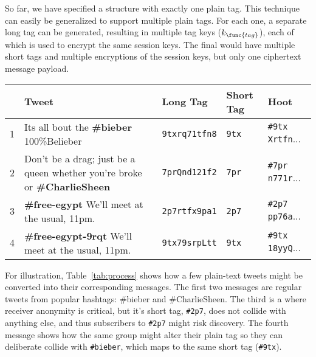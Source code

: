 So far, we have specified a \hoot structure with exactly one plain tag.
This technique can easily be generalized to support multiple plain tags. For
each one, a separate long tag can be generated, resulting in multiple
tag keys ($k_{\func{tag}}$), each of which is used to encrypt the same
session keys. The final \hoot would have multiple short tags and multiple
encryptions of the session keys, but only one ciphertext message
payload.

\begin{table*}
\caption{This table shows how several tweets might be converted to
  \hoot messages, showing the long tag, the short tag, and the final
  \hoot. The fourth message in this list demonstrates how an
  organization could take advantage of the \hoot system to collide its
  messages with those of an unrelated tag used for non-controversial
  messages.
\label{tab:process}
}
\begin{center}
    \begin{tabular}{ l  l  l  l  l }
	 & Tweet & Long Tag & Short Tag & Hoot \\ \hline
	1 & Its all bout the {\bf \#bieber} 100\%Belieber                                 & {\tt 9txrq71tfn8} &  {\tt 9tx} & {\tt \#9tx Xrtfn}... \\
	2 & Don't be a drag; just be a queen whether you're broke or {\bf \#CharlieSheen} & {\tt 7prQnd121f2} & {\tt 7pr} & {\tt \#7pr n771r}... \\
	3 & {\bf \#free-egypt} We'll meet at the usual, 11pm.                             & {\tt 2p7rtfx9pa1} & {\tt 2p7} & {\tt \#2p7 pp76a}... \\
	4 & {\bf \#free-egypt-9rqt} We'll meet at the usual, 11pm.                        & {\tt 9tx79srpLtt} &  {\tt 9tx}  & {\tt \#9tx 18yyQ}... \\
    \end{tabular}
\end{center}
\end{table*}

For illustration, Table~\ref{tab:process} shows how a few plain-text
tweets might be converted into their corresponding \hoot messages. The
first two messages are regular tweets from popular hashtags: \#bieber
and \#CharlieSheen. The third is a \hoot where receiver anonymity is
critical, but it's short tag, {\tt \#2p7}, does not collide with
anything else, and thus subscribers to {\tt \#2p7} might risk
discovery. The fourth message shows how the same group might alter
their plain tag so they can deliberate collide with {\tt \#bieber},
which maps to the same short tag ({\tt \#9tx}).



